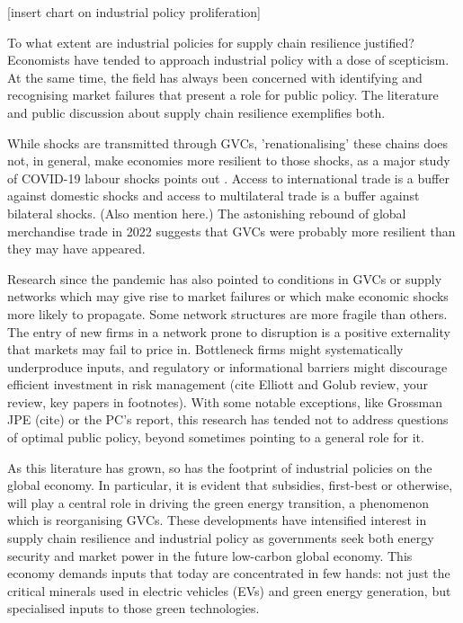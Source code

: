 \documentclass{article}
\begin{document}
[insert chart on industrial policy proliferation]

To what extent are industrial policies for supply chain resilience justified? Economists have tended to approach industrial policy with a dose of scepticism. At the same time, the field has always been concerned with identifying and recognising market failures that present a role for public policy. The literature and public discussion about supply chain resilience exemplifies both.

While shocks are transmitted through GVCs, 'renationalising' these chains does not, in general, make economies more resilient to those shocks, as a major study of COVID-19 labour shocks points out \parencite{bonadio_global_2021}. Access to international trade is a buffer against domestic shocks and access to multilateral trade is a buffer against bilateral shocks. (Also mention \textcite{caselli_diversification_2020} here.) The astonishing rebound of global merchandise trade in 2022 suggests that GVCs were probably more resilient than they may have appeared.

Research since the pandemic has also pointed to conditions in GVCs or supply networks which may give rise to market failures or which make economic shocks more likely to propagate. Some network structures are more fragile than others. The entry of new firms in a network prone to disruption is a positive externality that markets may fail to price in. Bottleneck firms might systematically underproduce inputs, and regulatory or informational barriers might discourage efficient investment in risk management (cite Elliott and Golub review, your review, key papers in footnotes). With some notable exceptions, like Grossman JPE (cite) or the PC's report, this research has tended not to address questions of optimal public policy, beyond sometimes pointing to a general role for it.

As this literature has grown, so has the footprint of industrial policies on the global economy. In particular, it is evident that subsidies, first-best or otherwise, will play a central role in driving the green energy transition, a phenomenon which is reorganising GVCs. These developments have intensified interest in supply chain resilience and industrial policy as governments seek both energy security and market power in the future low-carbon global economy. This economy demands inputs that today are concentrated in few hands: not just the critical minerals used in electric vehicles (EVs) and green energy generation, but specialised inputs to those green technologies.
\end{document}

